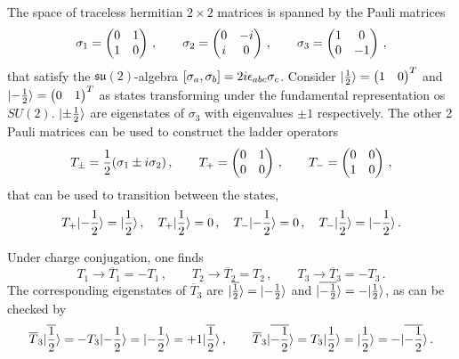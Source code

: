 The space of traceless hermitian $2\times 2$ matrices is spanned by the Pauli matrices
\begin{equation}
    \sigma_1=\begin{pmatrix}
        0&1\\1&0
    \end{pmatrix}\,,\qquad
    \sigma_2=\begin{pmatrix}
        0&-{i}\\{i}&0
    \end{pmatrix}\,,\qquad
    \sigma_3=\begin{pmatrix}
    1&0\\0&-1
    \end{pmatrix}\,,
\end{equation}
that satisfy the $\mathfrak{su}(2)$-algebra ${[\sigma_a,\sigma_b]=2{i}\epsilon_{abc}\sigma_c}$. Consider ${\lvert\frac{1}{2}\rangle}=\begin{pmatrix}1&0\end{pmatrix}^T$ and ${\lvert-\frac{1}{2}\rangle}=\begin{pmatrix}0&1\end{pmatrix}^T$ as states transforming under the fundamental representation os $SU(2)$. ${\lvert\pm \frac{1}{2}\rangle}$ are eigenstates of $\sigma_3$ with eigenvalues ${\pm1}$ respectively. The other 2 Pauli matrices can be used to construct the ladder operators
\begin{equation}
    T_{\pm}=\frac{1}{2}(\sigma_1\pm{i}\sigma_2)\,,\qquad
    T_+=\begin{pmatrix}
            0&1\\0&0
    \end{pmatrix}\,,\qquad
    T_-=\begin{pmatrix}
            0&0\\1&0
    \end{pmatrix}\,,
\end{equation}
that can be used to transition between the states,
\begin{equation}
    T_+{\lvert-\frac{1}{2}\rangle}={\lvert\frac{1}{2}\rangle}\,,\quad T_+{\lvert\frac{1}{2}\rangle}=0\,,\quad T_-{\lvert-\frac{1}{2}\rangle}=0\,,\quad T_-{\lvert\frac{1}{2}\rangle}={\lvert-\frac{1}{2}\rangle}\,.
\end{equation}

Under charge conjugation, one finds
\begin{equation}
    T_1\to\overline{T}_1=-T_1\,,\qquad T_2\to\overline{T}_2=T_2\,,\qquad T_3\to\overline{T}_3=-T_3\,.
\end{equation}
The corresponding eigenstates of $\overline{T}_3$ are ${{\lvert\overline{\frac{1}{2}}\rangle}={\lvert-\frac{1}{2}\rangle}}$ and ${{\lvert\overline{-\frac{1}{2}}\rangle}=-{\lvert\frac{1}{2}\rangle}}$, as can be checked by
\begin{equation}
    \overline{T}_3{\lvert\overline{\frac{1}{2}}\rangle}=-T_3{\lvert-\frac{1}{2}\rangle}={\lvert-\frac{1}{2}\rangle}=+1{\lvert\overline{\frac{1}{2}}\rangle}\,,\qquad \overline{T}_3{\lvert\overline{-\frac{1}{2}}\rangle}=T_3{\lvert\frac{1}{2}\rangle}={\lvert\frac{1}{2}\rangle}=-{\lvert\overline{-\frac{1}{2}}\rangle}\,.
\end{equation}




